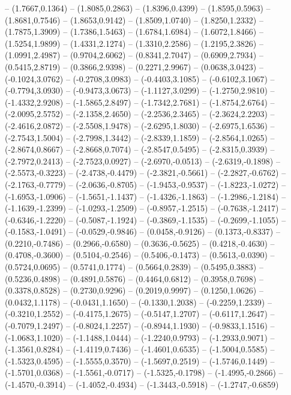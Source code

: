 {	-- (1.7667,0.1364)
	-- (1.8085,0.2863)
	-- (1.8396,0.4399)
	-- (1.8595,0.5963)
	-- (1.8681,0.7546)
	-- (1.8653,0.9142)
	-- (1.8509,1.0740)
	-- (1.8250,1.2332)
	-- (1.7875,1.3909)
	-- (1.7386,1.5463)
	-- (1.6784,1.6984)
	-- (1.6072,1.8466)
	-- (1.5254,1.9899)
	-- (1.4331,2.1274)
	-- (1.3310,2.2586)
	-- (1.2195,2.3826)
	-- (1.0991,2.4987)
	-- (0.9704,2.6062)
	-- (0.8341,2.7047)
	-- (0.6909,2.7934)
	-- (0.5415,2.8719)
	-- (0.3866,2.9398)
	-- (0.2271,2.9967)
	-- (0.0638,3.0423)
	-- (-0.1024,3.0762)
	-- (-0.2708,3.0983)
	-- (-0.4403,3.1085)
	-- (-0.6102,3.1067)
	-- (-0.7794,3.0930)
	-- (-0.9473,3.0673)
	-- (-1.1127,3.0299)
	-- (-1.2750,2.9810)
	-- (-1.4332,2.9208)
	-- (-1.5865,2.8497)
	-- (-1.7342,2.7681)
	-- (-1.8754,2.6764)
	-- (-2.0095,2.5752)
	-- (-2.1358,2.4650)
	-- (-2.2536,2.3465)
	-- (-2.3624,2.2203)
	-- (-2.4616,2.0872)
	-- (-2.5508,1.9478)
	-- (-2.6295,1.8030)
	-- (-2.6975,1.6536)
	-- (-2.7543,1.5004)
	-- (-2.7998,1.3442)
	-- (-2.8339,1.1859)
	-- (-2.8564,1.0265)
	-- (-2.8674,0.8667)
	-- (-2.8668,0.7074)
	-- (-2.8547,0.5495)
	-- (-2.8315,0.3939)
	-- (-2.7972,0.2413)
	-- (-2.7523,0.0927)
	-- (-2.6970,-0.0513)
	-- (-2.6319,-0.1898)
	-- (-2.5573,-0.3223)
	-- (-2.4738,-0.4479)
	-- (-2.3821,-0.5661)
	-- (-2.2827,-0.6762)
	-- (-2.1763,-0.7779)
	-- (-2.0636,-0.8705)
	-- (-1.9453,-0.9537)
	-- (-1.8223,-1.0272)
	-- (-1.6953,-1.0906)
	-- (-1.5651,-1.1437)
	-- (-1.4326,-1.1863)
	-- (-1.2986,-1.2184)
	-- (-1.1639,-1.2399)
	-- (-1.0293,-1.2509)
	-- (-0.8957,-1.2515)
	-- (-0.7638,-1.2417)
	-- (-0.6346,-1.2220)
	-- (-0.5087,-1.1924)
	-- (-0.3869,-1.1535)
	-- (-0.2699,-1.1055)
	-- (-0.1583,-1.0491)
	-- (-0.0529,-0.9846)
	-- (0.0458,-0.9126)
	-- (0.1373,-0.8337)
	-- (0.2210,-0.7486)
	-- (0.2966,-0.6580)
	-- (0.3636,-0.5625)
	-- (0.4218,-0.4630)
	-- (0.4708,-0.3600)
	-- (0.5104,-0.2546)
	-- (0.5406,-0.1473)
	-- (0.5613,-0.0390)
	-- (0.5724,0.0695)
	-- (0.5741,0.1774)
	-- (0.5664,0.2839)
	-- (0.5495,0.3883)
	-- (0.5236,0.4898)
	-- (0.4891,0.5876)
	-- (0.4464,0.6812)
	-- (0.3958,0.7698)
	-- (0.3378,0.8528)
	-- (0.2730,0.9296)
	-- (0.2019,0.9997)
	-- (0.1250,1.0626)
	-- (0.0432,1.1178)
	-- (-0.0431,1.1650)
	-- (-0.1330,1.2038)
	-- (-0.2259,1.2339)
	-- (-0.3210,1.2552)
	-- (-0.4175,1.2675)
	-- (-0.5147,1.2707)
	-- (-0.6117,1.2647)
	-- (-0.7079,1.2497)
	-- (-0.8024,1.2257)
	-- (-0.8944,1.1930)
	-- (-0.9833,1.1516)
	-- (-1.0683,1.1020)
	-- (-1.1488,1.0444)
	-- (-1.2240,0.9793)
	-- (-1.2933,0.9071)
	-- (-1.3561,0.8284)
	-- (-1.4119,0.7436)
	-- (-1.4601,0.6535)
	-- (-1.5004,0.5585)
	-- (-1.5323,0.4595)
	-- (-1.5555,0.3570)
	-- (-1.5697,0.2519)
	-- (-1.5746,0.1449)
	-- (-1.5701,0.0368)
	-- (-1.5561,-0.0717)
	-- (-1.5325,-0.1798)
	-- (-1.4995,-0.2866)
	-- (-1.4570,-0.3914)
	-- (-1.4052,-0.4934)
	-- (-1.3443,-0.5918)
	-- (-1.2747,-0.6859)
}
